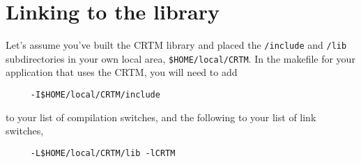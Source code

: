 \section{Linking to the library}
Let's assume you've built the CRTM library and placed the \texttt{/include} and \texttt{/lib} subdirectories in your own local area, \texttt{\$HOME/local/CRTM}. In the makefile for your application that uses the CRTM, you will need to add
\begin{verbatim}     -I$HOME/local/CRTM/include\end{verbatim}
to your list of compilation switches, and the following to your list of link switches,
\begin{verbatim}     -L$HOME/local/CRTM/lib -lCRTM\end{verbatim}
